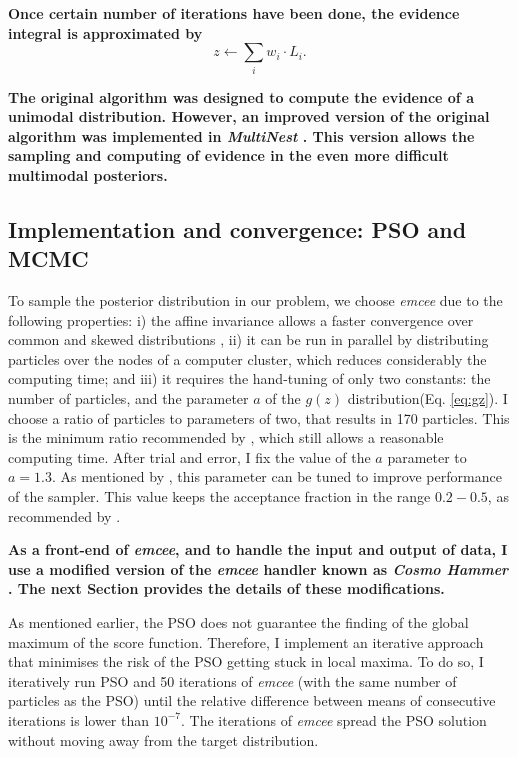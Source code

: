 \textbf{Once certain number of iterations have been done, the evidence integral is approximated by 
}\begin{equation}
z \leftarrow \sum_i w_i\cdot L_i.
\end{equation}

\textbf{The original algorithm was designed to compute the evidence of a unimodal distribution. However, an improved version of the original algorithm was implemented in \emph{MultiNest} \citep{Feroz2009}. This version allows the sampling and computing of evidence in the even more difficult multimodal posteriors.  }

\subsection{Implementation and convergence: PSO and MCMC}
To sample the posterior distribution in our problem, we choose \emph{emcee} due to the following properties: i) the affine invariance allows a faster convergence over common and skewed distributions \cite[see][for details]{Goodman2010,Foreman2013}, ii) it can be run in parallel by distributing particles over the nodes of a computer cluster, which reduces considerably the computing time; and iii) it requires the hand-tuning of only two constants: the number of particles, and the parameter $a$ of the $g(z)$ distribution(Eq. \ref{eq:gz}). I choose a ratio of particles to parameters of two, that results in 170 particles. This is the minimum ratio recommended by \citet{Foreman2013}, which still allows a reasonable computing time. After trial and error, I fix the value of the $a$ parameter to $a=1.3$. As mentioned by \citet{Goodman2010}, this parameter can be tuned to improve performance of the sampler. This value keeps the acceptance fraction in the range $0.2-0.5$, as recommended by \citet{Foreman2013}.

\textbf{As a front-end of \emph{emcee}, and to handle the input and output of data, I use a modified version of the \emph{emcee} handler known as \emph{Cosmo Hammer} \citep{Akeret2013}. The next Section provides the details of these modifications. }

As mentioned earlier, the PSO does not guarantee the finding of the global maximum of the score function. Therefore, I implement an iterative approach that minimises the risk of the PSO getting stuck in local maxima. To do so, I iteratively run PSO and 50 iterations of \emph{emcee} (with the same number of particles as the PSO) until the relative difference between means of consecutive iterations is lower than $10^{-7}$. The iterations of \emph{emcee} spread the PSO solution without moving away from the target distribution. 
 
